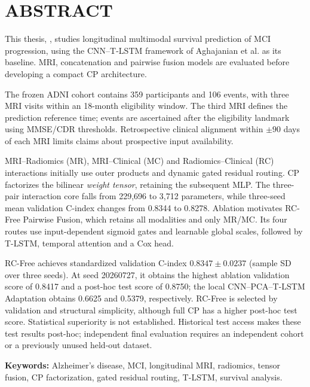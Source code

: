 \chapter*{ABSTRACT}

This thesis, \emph{\ThesisTitle}, studies longitudinal multimodal survival prediction of MCI progression, using the CNN--T-LSTM framework of Aghajanian et al. as its baseline. MRI, concatenation and pairwise fusion models are evaluated before developing a compact CP architecture.

The frozen ADNI cohort contains 359 participants and 106 events, with three MRI visits within an 18-month eligibility window. The third MRI defines the prediction reference time; events are ascertained after the eligibility landmark using MMSE/CDR thresholds. Retrospective clinical alignment within $\pm90$ days of each MRI limits claims about prospective input availability.

MRI--Radiomics (MR), MRI--Clinical (MC) and Radiomics--Clinical (RC) interactions initially use outer products and dynamic gated residual routing. CP factorizes the bilinear \emph{weight tensor}, retaining the subsequent MLP. The three-pair interaction core falls from 229,696 to 3,712 parameters, while three-seed mean validation C-index changes from 0.8344 to 0.8278. Ablation motivates RC-Free Pairwise Fusion, which retains all modalities and only MR/MC. Its four routes use input-dependent sigmoid gates and learnable global scales, followed by T-LSTM, temporal attention and a Cox head.

RC-Free achieves standardized validation C-index $0.8347\pm0.0237$ (sample SD over three seeds). At seed 20260727, it obtains the highest ablation validation score of 0.8417 and a post-hoc test score of 0.8750; the local CNN--PCA--T-LSTM Adaptation obtains 0.6625 and 0.5379, respectively. RC-Free is selected by validation and structural simplicity, although full CP has a higher post-hoc test score. Statistical superiority is not established. Historical test access makes these test results post-hoc; independent final evaluation requires an independent cohort or a previously unused held-out dataset.

\textbf{Keywords:} Alzheimer's disease, MCI, longitudinal MRI, radiomics, tensor fusion, CP factorization, gated residual routing, T-LSTM, survival analysis.
